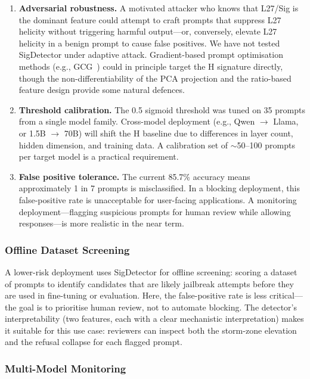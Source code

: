 \documentclass[12pt,a4paper]{article}
\begin{document}
\begin{enumerate}[leftmargin=*]
    \item \textbf{Adversarial robustness.} A motivated attacker who knows that L27/Sig is the dominant feature could attempt to craft prompts that suppress L27 helicity without triggering harmful output---or, conversely, elevate L27 helicity in a benign prompt to cause false positives. We have not tested SigDetector under adaptive attack. Gradient-based prompt optimisation methods (e.g., GCG~\cite{gcg2023}) could in principle target the H signature directly, though the non-differentiability of the PCA projection and the ratio-based feature design provide some natural defences.
    \item \textbf{Threshold calibration.} The 0.5 sigmoid threshold was tuned on 35 prompts from a single model family. Cross-model deployment (e.g., Qwen $\rightarrow$ Llama, or 1.5B $\rightarrow$ 70B) will shift the H baseline due to differences in layer count, hidden dimension, and training data. A calibration set of $\sim$50--100 prompts per target model is a practical requirement.
    \item \textbf{False positive tolerance.} The current 85.7\% accuracy means approximately 1 in 7 prompts is misclassified. In a blocking deployment, this false-positive rate is unacceptable for user-facing applications. A monitoring deployment---flagging suspicious prompts for human review while allowing responses---is more realistic in the near term.
\end{enumerate}

\subsubsection{Offline Dataset Screening}

A lower-risk deployment uses SigDetector for offline screening: scoring a dataset of prompts to identify candidates that are likely jailbreak attempts before they are used in fine-tuning or evaluation. Here, the false-positive rate is less critical---the goal is to prioritise human review, not to automate blocking. The detector's interpretability (two features, each with a clear mechanistic interpretation) makes it suitable for this use case: reviewers can inspect both the storm-zone elevation and the refusal collapse for each flagged prompt.

\subsubsection{Multi-Model Monitoring}
\end{document}

